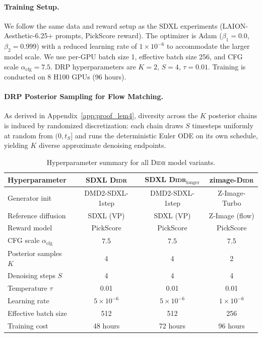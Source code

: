 \paragraph{Training Setup.}
We follow the same data and reward setup as the SDXL experiments (LAION-Aesthetic-6.25+ prompts, PickScore reward). The optimizer is Adam ($\beta_1=0.0$, $\beta_2=0.999$) with a reduced learning rate of $1\times10^{-6}$ to accommodate the larger model scale. We use per-GPU batch size 1, effective batch size 256, and CFG scale $\alpha_{\mathrm{cfg}}=7.5$. DRP hyperparameters are $K=2$, $S=4$, $\tau=0.01$. Training is conducted on 8 H100 GPUs (96 hours).

\paragraph{DRP Posterior Sampling for Flow Matching.}
As derived in Appendix~\ref{app:proof_lem4}, diversity across the $K$ posterior chains is induced by randomized discretization: each chain draws $S$ timesteps uniformly at random from $(0,t_S]$ and runs the deterministic Euler ODE on its own schedule, yielding $K$ diverse approximate denoising endpoints.

\begin{table}[!h]
\centering
\small
\setlength{\tabcolsep}{5pt}
\caption{Hyperparameter summary for all \textsc{Didr} model variants.}
\label{tab:hyperparams}
\begin{tabular}{lccc}
\toprule
\textbf{Hyperparameter} & \textbf{SDXL \textsc{Didr}} & \textbf{SDXL \textsc{Didr}$_{\text{longer}}$} & \textbf{zimage-\textsc{Didr}} \\
\midrule
Generator init          & DMD2-SDXL-1step    & DMD2-SDXL-1step    & Z-Image-Turbo \\
Reference diffusion     & SDXL (VP)          & SDXL (VP)          & Z-Image (flow) \\
Reward model            & PickScore          & PickScore          & PickScore \\
CFG scale $\alpha_{\mathrm{cfg}}$ & 7.5     & 7.5                & 7.5 \\
Posterior samples $K$   & 4                  & 4                  & 2 \\
Denoising steps $S$     & 4                  & 4                  & 4 \\
Temperature $\tau$      & 0.01               & 0.01               & 0.01 \\
Learning rate           & $5\times10^{-6}$   & $5\times10^{-6}$   & $1\times10^{-6}$ \\
Effective batch size    & 512                & 512                & 256 \\
Training cost           & 48 hours               & 72 hours               & 96 hours \\
\bottomrule
\end{tabular}
\end{table}


